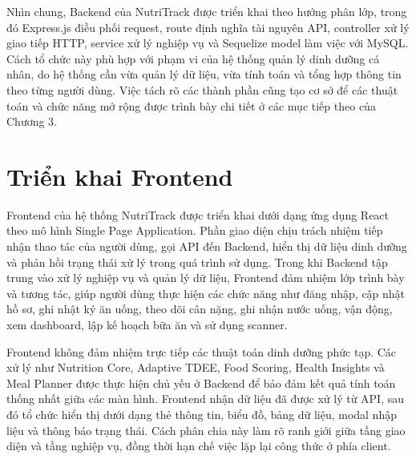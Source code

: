 \documentclass[12pt, a4paper]{report}
\begin{document}
Nhìn chung, Backend của NutriTrack được triển khai theo hướng phân lớp, trong đó Express.js điều phối request, route định nghĩa tài nguyên API, controller xử lý giao tiếp HTTP, service xử lý nghiệp vụ và Sequelize model làm việc với MySQL. Cách tổ chức này phù hợp với phạm vi của hệ thống quản lý dinh dưỡng cá nhân, do hệ thống cần vừa quản lý dữ liệu, vừa tính toán và tổng hợp thông tin theo từng người dùng. Việc tách rõ các thành phần cũng tạo cơ sở để các thuật toán và chức năng mở rộng được trình bày chi tiết ở các mục tiếp theo của Chương 3.

\section{Triển khai Frontend}Frontend của hệ thống NutriTrack được triển khai dưới dạng ứng dụng React theo mô hình Single Page Application. Phần giao diện chịu trách nhiệm tiếp nhận thao tác của người dùng, gọi API đến Backend, hiển thị dữ liệu dinh dưỡng và phản hồi trạng thái xử lý trong quá trình sử dụng. Trong khi Backend tập trung vào xử lý nghiệp vụ và quản lý dữ liệu, Frontend đảm nhiệm lớp trình bày và tương tác, giúp người dùng thực hiện các chức năng như đăng nhập, cập nhật hồ sơ, ghi nhật ký ăn uống, theo dõi cân nặng, ghi nhận nước uống, vận động, xem dashboard, lập kế hoạch bữa ăn và sử dụng scanner.

Frontend không đảm nhiệm trực tiếp các thuật toán dinh dưỡng phức tạp. Các xử lý như Nutrition Core, Adaptive TDEE, Food Scoring, Health Insights và Meal Planner được thực hiện chủ yếu ở Backend để bảo đảm kết quả tính toán thống nhất giữa các màn hình. Frontend nhận dữ liệu đã được xử lý từ API, sau đó tổ chức hiển thị dưới dạng thẻ thông tin, biểu đồ, bảng dữ liệu, modal nhập liệu và thông báo trạng thái. Cách phân chia này làm rõ ranh giới giữa tầng giao diện và tầng nghiệp vụ, đồng thời hạn chế việc lặp lại công thức ở phía client.
\end{document}
